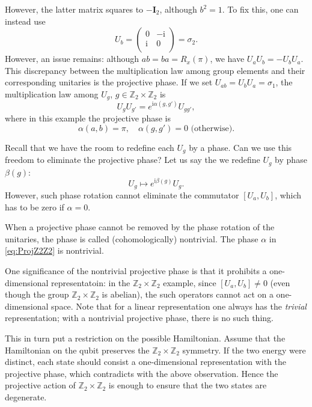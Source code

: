 \documentclass[
]{scrartcl}
\numberwithin{equation}{section}
\theoremstyle{definition}
\theoremstyle{definition}
\theoremstyle{definition}
\theoremstyle{definition}
\theoremstyle{remark}
\begin{document}
However, the latter matrix squares to \(-\mathbf{I}_2\), although \(b^2=1\).
To fix this, one can instead use
\begin{equation}
  \label{eq:UbZ2Z2}
  U_b = 
  \begin{pmatrix}
    0 & -\mathrm{i} \\
    \mathrm{i} & 0 \\
  \end{pmatrix} =\sigma_2.
\end{equation}
However, an issue remains: although \(ab = ba = R_x(\pi)\), we have \(U_a U_b = - U_b U_a\).
This discrepancy between the multiplication law among group elements and their corresponding unitaries is the projective phase.
If we set \(U_{ab} = U_b U_a = \sigma _1\), the multiplication law among \(U_g\), \(g\in \mathbb{Z}_2\times\mathbb{Z}_2\) is
\begin{equation}
  \label{eq:ProjRep}
  U_g U_{g'} = e^{\mathrm{i}\alpha(g,g')}U_{gg'},
\end{equation}
where in this example the projective phase is
\begin{equation}
  \label{eq:ProjZ2Z2}
    \alpha(a,b) = \pi,\quad
    \alpha(g,g') = 0 \,\, \text{(otherwise)}.
\end{equation}

Recall that we have the room to redefine each \(U_g\) by a phase. Can we use this freedom to eliminate the projective phase?
Let us say the we redefine \(U_g\) by phase \(\beta(g)\):
\begin{equation}
  \label{eq:Uredef}
  U_g \mapsto e^{\mathrm{i}\beta(g)}U_g.
\end{equation}
However, such phase rotation cannot eliminate the commutator \([U_a,U_b]\), which has to be zero if \(\alpha = 0\).

When a projective phase cannot be removed by the phase rotation of the unitaries, the phase is called (cohomologically) nontrivial. The phase \(\alpha\) in \eqref{eq:ProjZ2Z2} is nontrivial.

One significance of the nontrivial projective phase is that it prohibits a one-dimensional representatoin: in the \(\mathbb{Z}_2\times\mathbb{Z}_2\) example, since \([U_a,U_b]\neq 0\) (even though the group \(\mathbb{Z}_2\times \mathbb{Z}_2\) is abelian), the such operators cannot act on a one-dimensional space. Note that for a linear representation one always has the \emph{trivial} representation; with a nontrivial projective phase, there is no such thing.

This in turn put a restriction on the possible Hamiltonian.
Assume that the Hamiltonian on the qubit preserves the \(\mathbb{Z}_2\times \mathbb{Z}_2\) symmetry.
If the two energy were distinct, each state should consist a one-dimensional representation with the projective phase, which contradicts with the above observation. Hence the projective action of \(\mathbb{Z}_2\times \mathbb{Z}_2\) is enough to ensure that the two states are degenerate.
\end{document}

